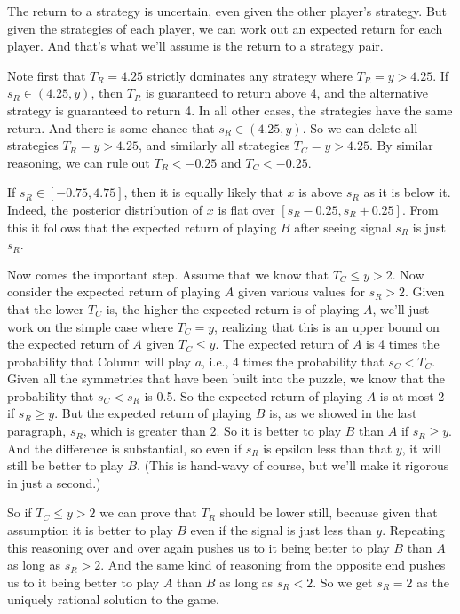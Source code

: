 \documentclass{article}
\begin{document}
The return to a strategy is uncertain, even given the other player's strategy. But given the strategies of each player, we can work out an expected return for each player. And that's what we'll assume is the return to a strategy pair.

Note first that $T_R = 4.25$ strictly dominates any strategy where $T_R  = y > 4.25$. If $s_R \in (4.25, y)$, then $T_R$ is guaranteed to return above 4, and the alternative strategy is guaranteed to return 4. In all other cases, the strategies have the same return. And there is some chance that $s_R \in (4.25, y)$. So we can delete all strategies $T_R  = y > 4.25$, and similarly all strategies $T_C = y > 4.25$. By similar reasoning, we can rule out $T_R < -0.25$ and $T_C < -0.25$.

If $s_R \in [-0.75, 4.75]$, then it is equally likely that $x$ is above $s_R$ as it is below it. Indeed, the posterior distribution of $x$ is flat over $[s_R - 0.25, s_R + 0.25]$. From this it follows that the expected return of playing $B$ after seeing signal $s_R$ is just $s_R$.

Now comes the important step. Assume that we know that $T_C \leq y > 2$. Now consider the expected return of playing $A$ given various values for $s_R > 2$. Given that the lower $T_C$ is, the higher the expected return is of playing $A$, we'll just work on the simple case where $T_C = y$, realizing that this is an upper bound on the expected return of $A$ given $T_C \leq y$. The expected return of $A$ is 4 times the probability that Column will play $a$, i.e., 4 times the probability that $s_C < T_C$. Given all the symmetries that have been built into the puzzle, we know that the probability that $s_C < s_R$ is 0.5. So the expected return of playing $A$ is at most 2 if $s_R \geq y$. But the expected return of playing $B$ is, as we showed in the last paragraph, $s_R$, which is greater than 2. So it is better to play $B$ than $A$ if $s_R \geq y$. And the difference is substantial, so even if $s_R$ is epsilon less than that $y$, it will still be better to play $B$. (This is hand-wavy of course, but we'll make it rigorous in just a second.) 

So if $T_C \leq y > 2$ we can prove that $T_R$ should be lower still, because given that assumption it is better to play $B$ even if the signal is just less than $y$. Repeating this reasoning over and over again pushes us to it being better to play $B$ than $A$ as long as $s_R > 2$. And the same kind of reasoning from the opposite end pushes us to it being better to play $A$ than $B$ as long as $s_R < 2$. So we get $s_R = 2$ as the uniquely rational solution to the game.
\end{document}
